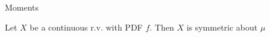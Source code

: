 \documentclass[8pt]{beamer}
\begin{document}
\begin{frame}{Moments}
    \begin{lemma}
        Let $X$ be a continuous r.v. with PDF $f$. Then $X$ is symmetric about $\mu$ 
    \end{lemma}
\end{frame}
\end{document}
